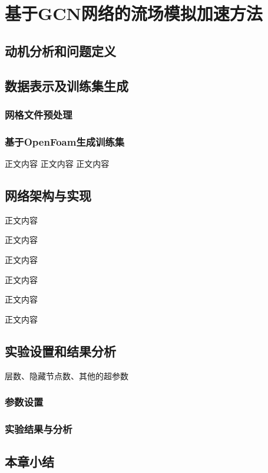 \chapter{基于GCN网络的流场模拟加速方法}


\section{动机分析和问题定义}



\section{数据表示及训练集生成}


\subsection{网格文件预处理}

\subsection{基于OpenFoam生成训练集}
正文内容
正文内容
正文内容



\section{网络架构与实现}
正文内容

正文内容



正文内容

正文内容

正文内容

正文内容

\section{实验设置和结果分析}

层数、隐藏节点数、其他的超参数

\subsection{参数设置}



\subsection{实验结果与分析}



\section{本章小结}

